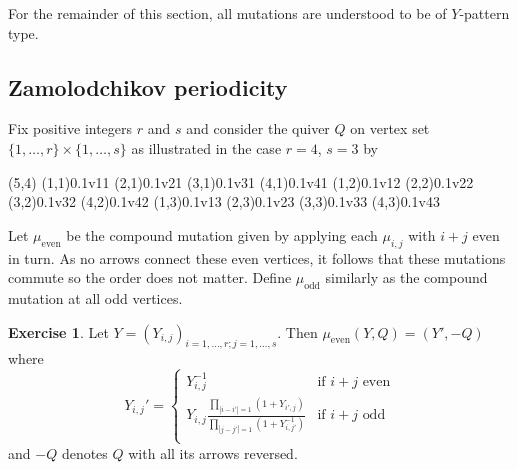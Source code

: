 \documentclass{amsart}
\theoremstyle{definition}
\newtheorem{exercise}[theorem]{Exercise}
\theoremstyle{remark}
\numberwithin{equation}{section}
\begin{document}
For the remainder of this section, all mutations are understood to be of $Y$-pattern type.

\subsection{Zamolodchikov periodicity}
	Fix positive integers $r$ and $s$ and consider the quiver $Q$ on vertex set $\{1,\ldots, r \} \times \{1,\ldots, s\}$ as illustrated in the case $r=4$, $s=3$ by
	
	\begin{pspicture}(5,4)
		\cnode(1,1){0.1}{v11}
		\cnode(2,1){0.1}{v21}
		\cnode(3,1){0.1}{v31}
		\cnode(4,1){0.1}{v41}
		\cnode(1,2){0.1}{v12}
		\cnode(2,2){0.1}{v22}
		\cnode(3,2){0.1}{v32}
		\cnode(4,2){0.1}{v42}
		\cnode(1,3){0.1}{v13}
		\cnode(2,3){0.1}{v23}
		\cnode(3,3){0.1}{v33}
		\cnode(4,3){0.1}{v43}
	\end{pspicture}
	
	Let $\mu_{\textrm{even}}$ be the compound mutation given by applying each $\mu_{i,j}$ with $i+j$ even in turn.  As no arrows connect these even vertices, it follows that these mutations commute so the order does not matter.  Define $\mu_{\textrm{odd}}$ similarly as the compound mutation at all odd vertices.
	
	\begin{exercise}
		Let $Y = (Y_{i,j})_{i=1,\ldots, r; j=1,\ldots, s}$.  Then $\mu_{\textrm{even}}(Y,Q) = (Y',-Q)$ where
		\begin{equation} \label{eq:YSystemCases}
			Y_{i,j}' = \begin{cases}
			Y_{i,j}^{-1} & \textrm{if $i+j$ even} \\
			Y_{i,j}\frac{\displaystyle\prod_{|i-i'|=1}(1+Y_{i',j})}{\displaystyle\prod_{|j-j'|=1}(1+Y_{i,j'}^{-1})} & \textrm{if $i+j$ odd} \\
			\end{cases}
		\end{equation}
		and $-Q$ denotes $Q$ with all its arrows reversed.
	\end{exercise}
	
\end{document}
